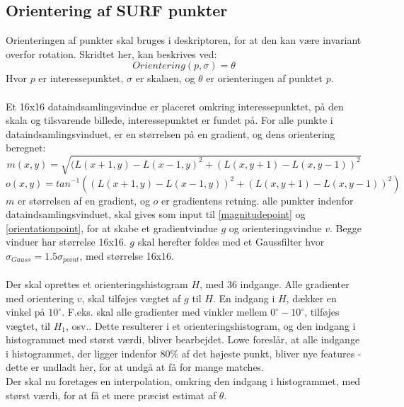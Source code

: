 \subsection{Orientering af SURF punkter}
Orienteringen af punkter skal bruges i deskriptoren, for at den kan være invariant overfor rotation. Skridtet her, kan beskrives ved:
\begin{equation}
Orientering(p, \sigma) = \theta
\end{equation}
Hvor $p$ er interessepunktet, $\sigma$ er skalaen, og $\theta$ er orienteringen af punktet $p$. 
\\
\\
Et 16x16 dataindsamlingsvindue er placeret omkring interessepunktet, på den skala og tilsvarende billede, interessepunktet er fundet på. For alle punkte i dataindsamlingsvinduet, er en størrelsen på en gradient, og dens orientering beregnet:
\begin{equation}
m(x,y) = \sqrt{(L(x + 1, y) - L(x - 1, y)^2 + (L(x, y + 1) - L(x, y - 1))^2  } 
\label{magnitudepoint}
\end{equation}
\begin{equation}
o(x,y) = tan^{-1}((L(x + 1, y) - L(x - 1, y))^2 + (L(x, y + 1) - L(x, y - 1))^2 ) 
\label{orientationpoint}
\end{equation}
$m$ er størrelsen af en gradient, og $o$ er gradientens retning. alle punkter indenfor dataindsamlingsvinduet, skal gives som input til \eqref{magnitudepoint} og \eqref{orientationpoint}, for at skabe et gradientvindue $g$ og orienteringsvindue $v$. Begge vinduer har størrelse 16x16. $g$ skal herefter foldes med et Gaussfilter hvor $\sigma_{Gauss} = 1.5\sigma_{point} $, med størrelse 16x16.
\\
\\
Der skal oprettes et orienteringshistogram $H$, med 36 indgange. Alle gradienter med orientering $v$, skal tilføjes vægtet af $g$ til $H$. En indgang i $H$, dækker en vinkel på $10^{\circ}$. F.eks. skal alle gradienter med vinkler mellem  $0^{\circ}-10^{\circ}$, tilføjes vægtet, til $H_1$, osv.. Dette resulterer i et orienteringshistogram, og den indgang i histogrammet med størst værdi, bliver bearbejdet. Lowe foreslår, at alle indgange i histogrammet, der ligger indenfor 80\% af det højeste punkt, bliver nye features - dette er undladt her, for at undgå at få for mange matches.
\\
Der skal nu foretages en interpolation, omkring den indgang i histogrammet, med størst værdi, for at få et mere præcist estimat af $\theta$.

